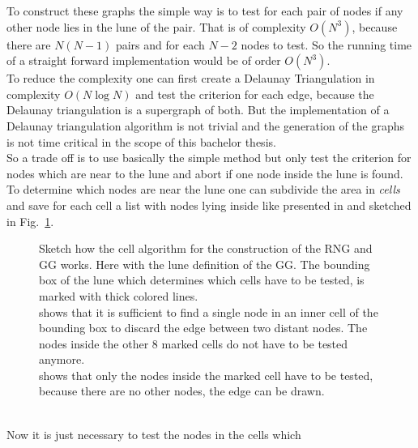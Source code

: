     To construct these graphs the simple way is to test for each
    pair of nodes if any other node lies in
    the lune of the pair. That is of complexity \(O (N^3)\), because
    there are \(N(N-1)\) pairs and for each \(N-2\) nodes to test. So
    the running time of a straight forward implementation would be of
    order \(O(N^3)\).\\
    To reduce the complexity one can first create a Delaunay
    Triangulation in complexity \(O (N \log N)\)
    \cite{RNGCell} and test the criterion for each edge, because
    the Delaunay triangulation is a supergraph of both. But the
    implementation of a Delaunay triangulation algorithm is not trivial
    and the generation of the graphs is not time critical in the scope
    of this bachelor thesis.\\
    So a trade off is to use basically the simple method but only test
    the criterion for nodes which are near to the lune and abort if
    one node inside the lune is found. To determine which nodes are
    near the lune one can subdivide the area in \emph{cells} and save
    for each cell a list with nodes lying inside like presented in
    \cite{RNGCell} and sketched in Fig.\ \ref{fig:cell}.
    \begin{figure}[htbp]
        \centering
        \caption[Sketch how the Cell Method Works]
        {
            Sketch how the cell algorithm for the construction of the
            RNG and GG works. Here with the lune definition of the GG.
            The bounding box of the lune which determines which cells have
            to be tested, is marked with thick colored lines.\\
             shows that it is sufficient to find a
            single node in an inner cell of the bounding box to discard
            the edge between two distant nodes. The nodes inside the
            other 8 marked cells do not have to be tested anymore.\\
             shows that only the nodes inside the
            marked cell have to be tested, because there are no other nodes,
            the edge can be drawn.
        }
        \label{fig:cell}
    \end{figure}\\
    Now it is just necessary to test the nodes in the cells which
